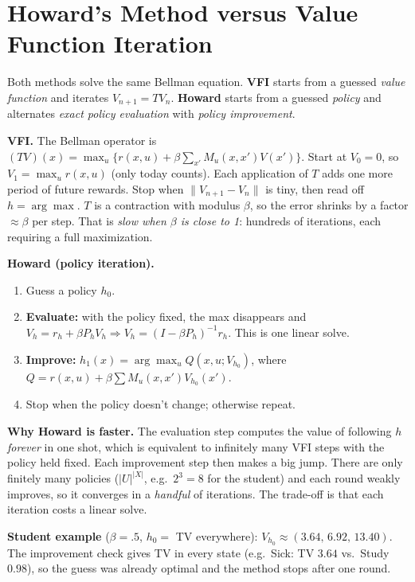 \documentclass[10pt]{article}
\begin{document}
\section{Howard's Method versus Value Function Iteration}

\begin{bigidea}
Both methods solve the same Bellman equation. \textbf{VFI} starts from a guessed \emph{value function} and iterates $V_{n+1}=TV_n$. \textbf{Howard} starts from a guessed \emph{policy} and alternates \emph{exact policy evaluation} with \emph{policy improvement}.
\end{bigidea}

\textbf{VFI.} The Bellman operator is $(TV)(x)=\max_u\{r(x,u)+\beta\sum_{x'}M_u(x,x')V(x')\}$. Start at $V_0=0$, so $V_1=\max_ur(x,u)$ (only today counts). Each application of $T$ adds one more period of future rewards. Stop when $\|V_{n+1}-V_n\|$ is tiny, then read off $h=\arg\max$. $T$ is a contraction with modulus $\beta$, so the error shrinks by a factor $\approx\beta$ per step. That is \emph{slow when $\beta$ is close to 1}: hundreds of iterations, each requiring a full maximization.

\textbf{Howard (policy iteration).}
\begin{enumerate}[leftmargin=*]
\item Guess a policy $h_0$.
\item \textbf{Evaluate:} with the policy fixed, the max disappears and $V_h=r_h+\beta P_hV_h\Rightarrow V_h=(I-\beta P_h)^{-1}r_h$. This is one linear solve.
\item \textbf{Improve:} $h_1(x)=\arg\max_uQ(x,u;V_{h_0})$, where $Q=r(x,u)+\beta\sum M_u(x,x')V_{h_0}(x')$.
\item Stop when the policy doesn't change; otherwise repeat.
\end{enumerate}
\textbf{Why Howard is faster.} The evaluation step computes the value of following $h$ \emph{forever} in one shot, which is equivalent to infinitely many VFI steps with the policy held fixed. Each improvement step then makes a big jump. There are only finitely many policies ($|U|^{|X|}$, e.g.\ $2^3=8$ for the student) and each round weakly improves, so it converges in a \emph{handful} of iterations. The trade-off is that each iteration costs a linear solve.

\textbf{Student example} ($\beta=.5$, $h_0=$ TV everywhere): $V_{h_0}\approx(3.64,\,6.92,\,13.40)$. The improvement check gives TV in every state (e.g.\ Sick: TV $3.64$ vs.\ Study $0.98$), so the guess was already optimal and the method stops after one round.
\end{document}
